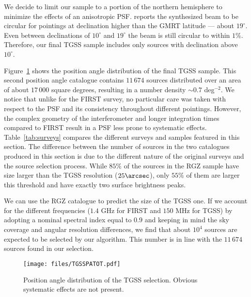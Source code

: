 			We decide to limit our sample to a portion of the northern hemisphere to minimize the effects of an anisotropic PSF. \cite{Intema2016} reports the synthesized beam to be circular for pointings at declination higher than the GMRT latitude --- about $19^\circ$. Even between declinations of $10^\circ$ and $19^\circ$ the beam is still circular to within $1\%$. Therefore, our final TGSS sample includes only sources with declination above $10^\circ$.
			
			Figure~\ref{fig:TGSSPAdist} shows the position angle distribution of the final TGSS sample. This second position angle catalogue contains $11\,674$ sources distributed over an area of about $17\,000$ square degrees, resulting in a number density $\sim0.7$ deg$^{-2}$. We notice that unlike for the FIRST survey, no particular care was taken with respect to the PSF and its consistency throughout different pointings. However, the  complex geometry of the interferometer and longer integration times compared to FIRST result in a PSF less prone to systematic effects. 
			Table~\ref{tab:surveys} compares the different surveys and samples featured in this section. The difference between the number of sources in the two catalogues produced in this section is due to the different nature of the original surveys and the source selection process. While $85\%$ of the sources in the RGZ sample have size larger than the TGSS resolution ($25\arcsec$), only $55\%$ of them are larger this threshold and have exactly two surface brightness peaks.
			
			We can use the RGZ catalogue to predict the size of the TGSS one. If we account for the different frequencies ($1.4$ GHz for FIRST and $150$ MHz for TGSS) by adopting a nominal spectral index equal to $0.9$ \citep{Vollmer2010} and keeping in mind the sky coverage and angular resolution differences, we find that about $10^4$ sources are expected to be selected by our algorithm. This number is in line with the $11\,674$ sources found in our selection.
			
			\begin{figure}
				\centering
				\texttt{[image: files/TGSSPATOT.pdf]}
				\caption{Position angle distribution of the TGSS selection. Obvious systematic effects are not present.}
				
				\label{fig:TGSSPAdist}
			\end{figure}


